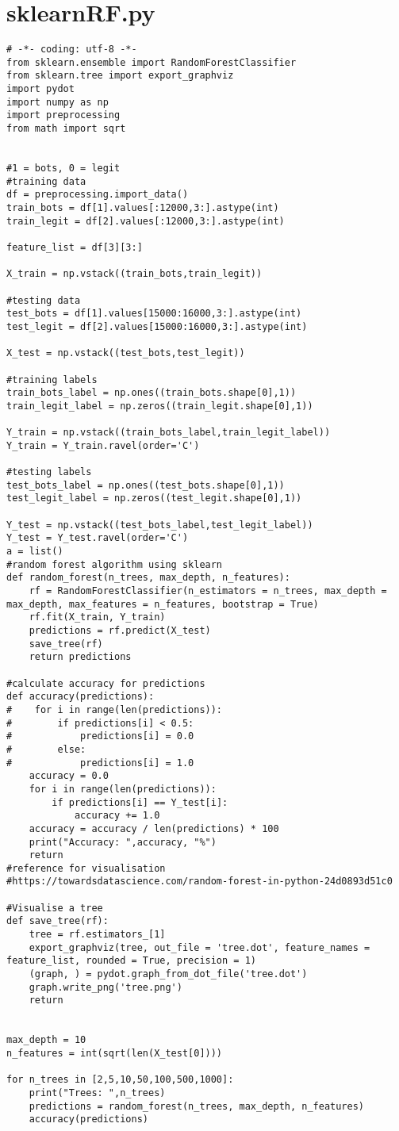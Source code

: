 \section{sklearnRF.py}
\begin{lstlisting}
# -*- coding: utf-8 -*-
from sklearn.ensemble import RandomForestClassifier
from sklearn.tree import export_graphviz
import pydot
import numpy as np
import preprocessing
from math import sqrt


#1 = bots, 0 = legit
#training data
df = preprocessing.import_data()
train_bots = df[1].values[:12000,3:].astype(int)
train_legit = df[2].values[:12000,3:].astype(int)

feature_list = df[3][3:]

X_train = np.vstack((train_bots,train_legit))

#testing data
test_bots = df[1].values[15000:16000,3:].astype(int)
test_legit = df[2].values[15000:16000,3:].astype(int)

X_test = np.vstack((test_bots,test_legit))

#training labels
train_bots_label = np.ones((train_bots.shape[0],1))
train_legit_label = np.zeros((train_legit.shape[0],1))

Y_train = np.vstack((train_bots_label,train_legit_label))
Y_train = Y_train.ravel(order='C')

#testing labels
test_bots_label = np.ones((test_bots.shape[0],1))
test_legit_label = np.zeros((test_legit.shape[0],1))

Y_test = np.vstack((test_bots_label,test_legit_label))
Y_test = Y_test.ravel(order='C')
a = list()
#random forest algorithm using sklearn
def random_forest(n_trees, max_depth, n_features):
    rf = RandomForestClassifier(n_estimators = n_trees, max_depth = max_depth, max_features = n_features, bootstrap = True)
    rf.fit(X_train, Y_train)
    predictions = rf.predict(X_test)
    save_tree(rf)
    return predictions

#calculate accuracy for predictions
def accuracy(predictions):
#    for i in range(len(predictions)):
#        if predictions[i] < 0.5:
#            predictions[i] = 0.0
#        else:
#            predictions[i] = 1.0
    accuracy = 0.0
    for i in range(len(predictions)):
        if predictions[i] == Y_test[i]:
            accuracy += 1.0
    accuracy = accuracy / len(predictions) * 100
    print("Accuracy: ",accuracy, "%")
    return
#reference for visualisation
#https://towardsdatascience.com/random-forest-in-python-24d0893d51c0

#Visualise a tree
def save_tree(rf):
    tree = rf.estimators_[1]
    export_graphviz(tree, out_file = 'tree.dot', feature_names = feature_list, rounded = True, precision = 1)
    (graph, ) = pydot.graph_from_dot_file('tree.dot')
    graph.write_png('tree.png')
    return


max_depth = 10
n_features = int(sqrt(len(X_test[0])))

for n_trees in [2,5,10,50,100,500,1000]:
    print("Trees: ",n_trees)
    predictions = random_forest(n_trees, max_depth, n_features)
    accuracy(predictions)

\end{lstlisting}

